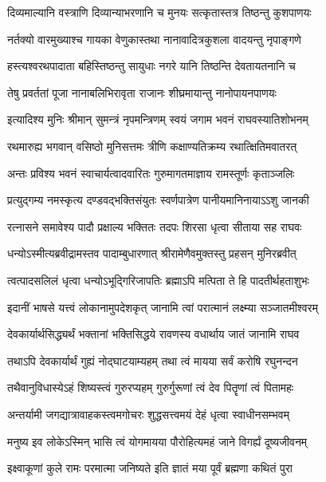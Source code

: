 \twolineshloka
{दिव्यमाल्यानि वस्त्राणि दिव्यान्याभरणानि च}
{मुनयः सत्कृतास्तत्र तिष्ठन्तु कुशपाणयः} %

\twolineshloka
{नर्तक्यो वारमुख्याश्च गायका वेणुकास्तथा}
{नानावादित्रकुशला वादयन्तु नृपाङ्गणे} %

\twolineshloka
{हस्त्यश्वरथपादाता बहिस्तिष्ठन्तु सायुधाः}
{नगरे यानि तिष्ठन्ति देवतायतनानि च} %

\twolineshloka
{तेषु प्रवर्ततां पूजा नानाबलिभिरावृता}
{राजानः शीघ्रमायान्तु नानोपायनपाणयः} %

\twolineshloka
{इत्यादिश्य मुनिः श्रीमान् सुमन्त्रं नृपमन्त्रिणम्}
{स्वयं जगाम भवनं राघवस्यातिशोभनम्} %

\twolineshloka
{रथमारुह्य भगवान् वसिष्ठो मुनिसत्तमः}
{त्रीणि कक्षाण्यतिक्रम्य रथात्क्षितिमवातरत्} %

\twolineshloka
{अन्तः प्रविश्य भवनं स्वाचार्यत्वादवारितः}
{गुरुमागतमाज्ञाय रामस्तूर्णः कृताञ्जलिः} %

\twolineshloka
{प्रत्युद्गम्य नमस्कृत्य दण्डवद्भक्तिसंयुतः}
{स्वर्णपात्रेण पानीयमानिनायाऽऽशु जानकी} %

\twolineshloka
{रत्नासने समावेश्य पादौ प्रक्षाल्य भक्तितः}
{तदपः शिरसा धृत्वा सीताया सह राघवः} %

\twolineshloka
{धन्योऽस्मीत्यब्रवीद्रामस्तव पादाम्बुधारणात्}
{श्रीरामेणैवमुक्तस्तु प्रहसन् मुनिरब्रवीत्} %

\twolineshloka
{त्वत्पादसलिलं धृत्वा धन्योऽभूद्गिरिजापतिः}
{ब्रह्माऽपि मत्पिता ते हि पादतीर्थहताशुभः} %

\twolineshloka
{इदानीं भाषसे यत्त्वं लोकानामुपदेशकृत्}
{जानामि त्वां परात्मानं लक्ष्म्या सञ्जातमीश्वरम्} %

\twolineshloka
{देवकार्यार्थसिद्ध्यर्थं भक्तानां भक्तिसिद्धये}
{रावणस्य वधार्थाय जातं जानामि राघव} %

\twolineshloka
{तथाऽपि देवकार्यार्थं गुह्यं नोद्घाटयाम्यहम्}
{तथा त्वं मायया सर्वं करोषि रघुनन्दन} %

\twolineshloka
{तथैवानुविधास्येऽहं शिष्यस्त्वं गुरुरप्यहम्}
{गुरुर्गुरूणां त्वं देव पितॄणां त्वं पितामहः} %

\twolineshloka
{अन्तर्यामी जगद्यात्रावाहकस्त्वमगोचरः}
{शुद्धसत्त्वमयं देहं धृत्वा स्वाधीनसम्भवम्} %

\twolineshloka
{मनुष्य इव लोकेऽस्मिन् भासि त्वं योगमायया}
{पौरोहित्यमहं जाने विगर्ह्यं दूष्यजीवनम्} %

\twolineshloka
{इक्ष्वाकूणां कुले रामः परमात्मा जनिष्यते}
{इति ज्ञातं मया पूर्वं ब्रह्मणा कथितं पुरा} %

